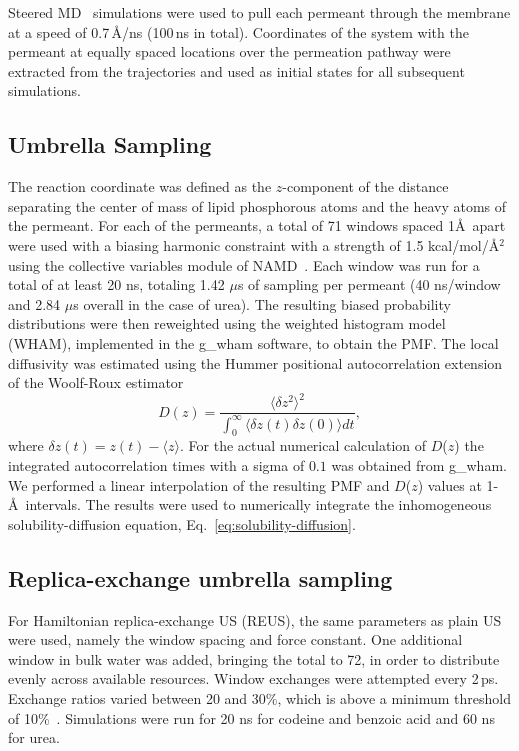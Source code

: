Steered MD~\cite{Izrailev1997,Sotomayor2007} simulations were used to pull each permeant through the membrane at a speed of 0.7\,\AA/ns (100\,ns in total).  Coordinates of the system with the permeant at equally spaced locations over the permeation pathway were extracted from the trajectories and used as initial states for all subsequent simulations.  

  \subsection*{Umbrella Sampling}

    \par The reaction coordinate was defined as the $z$-component of the distance separating the center of mass of lipid phosphorous atoms and the heavy atoms of the permeant. For each of the permeants, a total of 71 windows spaced 1\AA~apart were used with a biasing harmonic constraint with a strength of 1.5 kcal/mol/\AA$^2$ using the collective variables module of NAMD~\cite{Henin2010}.  Each window was run for a total of at least 20 ns, totaling 1.42 $\mu$s of sampling per permeant (40 ns/window and 2.84 $\mu$s overall in the case of urea). The resulting biased probability distributions were then reweighted using the weighted histogram model (WHAM)\cite{Kumar1992,Tan2012,Chodera2007}, implemented in the g\_wham software\cite{Hub2010}, to obtain the PMF. The local diffusivity was estimated using the Hummer positional autocorrelation extension of the Woolf-Roux estimator\cite{Hummer2005,Woolf1994}
    \begin{equation}
      D(z) = \frac{\langle\delta z^2\rangle^2}{\int_{0}^{\infty}\langle\delta z(t)\delta z(0)\rangle dt},
    \label{eq:hummer}
    \end{equation}
    where $\delta z(t) = z(t)-\langle z\rangle$. For the actual numerical calculation of $D$($z$) the integrated autocorrelation times with a sigma of $0.1$ was obtained from g\_wham. We performed a linear interpolation of the resulting PMF and $D$($z$) values at 1-\AA~intervals. The results were used to numerically integrate the inhomogeneous solubility-diffusion equation, Eq.~\ref{eq:solubility-diffusion}.

  \subsection*{Replica-exchange umbrella sampling}
    \par For Hamiltonian replica-exchange US (REUS), the same parameters as plain US were used, namely the window spacing and force constant. One additional window in bulk water was added, bringing the total to 72, in order to distribute evenly across available resources.  Window exchanges were attempted every 2\,ps. Exchange ratios varied between 20 and 30\%, which is above a minimum threshold of 10\%~\cite{Sugita1999}.  Simulations were run for 20 ns for codeine and benzoic acid and 60 ns for urea.

